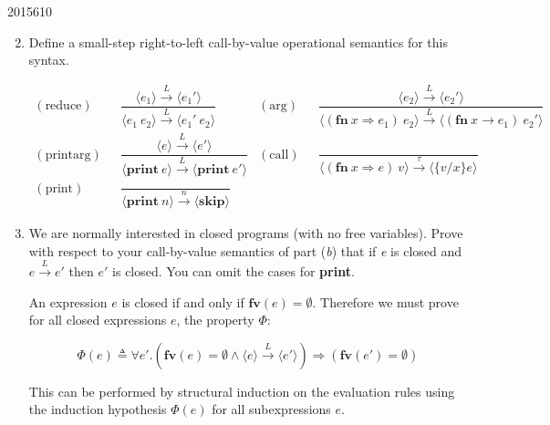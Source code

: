 \documentclass[10pt,\jkfside,a4paper]{article}
\begin{document}
\begin{examquestion}{2015}{6}{10}

\begin{enumerate}[label=(\alph*)]

\setcounter{enumi}{1}

\item Define a small-step right-to-left call-by-value operational semantics
for this syntax.

\begin{align*}
(\text{reduce}) \ \ \ &
\dfrac{
\langle e_1 \rangle \stackrel{L}{\to} \langle e_1' \rangle
}{
\langle e_1 \ e_2 \rangle \stackrel{L}{\to} \langle e_1' \ e_2 \rangle
}
&
(\text{arg}) \ \ \ &
\dfrac{
\langle e_2 \rangle \stackrel{L}{\to} \langle e_2' \rangle
}{
\langle (\textbf{fn} \ x \Rightarrow e_1) \ e_2 \rangle \stackrel{L}{\to} \langle (\textbf{fn}
\ x \to e_1) \ e_2' \rangle
} \\
(\text{printarg}) \ \ \ &
\dfrac{
\langle e \rangle \stackrel{L}{\to} \langle e' \rangle
}{
\langle \mathbf{print} \ e \rangle \stackrel{L}{\to} \langle \mathbf{print} \ e' \rangle
}
&
(\text{call}) \ \ \ &
\dfrac{
}{
\langle (\textbf{fn} \ x \Rightarrow e) \ v \rangle \stackrel{\tau}{\to}
\langle \{v/x\}e \rangle
} \\
(\text{print}) \ \ \ &
\dfrac{
}{
\langle \mathbf{print} \ n \rangle \stackrel{n}{\to} \langle \mathbf{skip}
\rangle
}
\end{align*}

\setcounter{enumi}{3}

\item We are normally interested in closed programs (with no free variables).
Prove with respect to your call-by-value semantics of part (\textit{b}) that
if \textit{e} is closed and $e \stackrel{L}{\longrightarrow} e'$ then $e'$
is closed. You can omit the cases for \textbf{print}.

An expression $e$ is closed if and only if $\mathbf{fv}(e) = \emptyset$. 
Therefore we must prove for all closed expressions $e$, the property $\Phi$:

\[
\Phi(e) \triangleq \forall e'. \left( \mathbf{fv} (e) = \emptyset \wedge
\langle e \rangle \stackrel{L}{\to} \langle e' \rangle \right)
\Longrightarrow (\mathbf{fv}(e') = \emptyset)
\]

This can be performed by structural induction on the evaluation rules using the
induction hypothesis $\Phi(e)$ for all subexpressions $e$.

\begin{enumerate}[label=(\textbf{Case})]


\end{enumerate}
\end{enumerate}
\end{examquestion}
\end{document}

